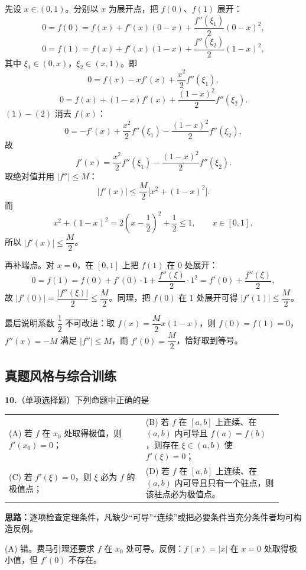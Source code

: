 先设 $x\in(0,1)$。分别以 $x$ 为展开点，把 $f(0)$、$f(1)$ 展开：
\[
0=f(0)=f(x)+f'(x)(0-x)+\frac{f''(\xi_1)}{2}(0-x)^{2},
\]
\[
0=f(1)=f(x)+f'(x)(1-x)+\frac{f''(\xi_2)}{2}(1-x)^{2},
\]
其中 $\xi_1\in(0,x)$，$\xi_2\in(x,1)$。即
\[
0=f(x)-xf'(x)+\frac{x^{2}}{2}f''(\xi_1),\tag{1}
\]
\[
0=f(x)+(1-x)f'(x)+\frac{(1-x)^{2}}{2}f''(\xi_2).\tag{2}
\]
$(1)-(2)$ 消去 $f(x)$：
\[
0=-f'(x)+\frac{x^{2}}{2}f''(\xi_1)-\frac{(1-x)^{2}}{2}f''(\xi_2),
\]
故
\[
f'(x)=\frac{x^{2}}{2}f''(\xi_1)-\frac{(1-x)^{2}}{2}f''(\xi_2).
\]
取绝对值并用 $|f''|\le M$：
\[
|f'(x)|\le\frac{M}{2}\bigl[x^{2}+(1-x)^{2}\bigr].
\]
而
\[
x^{2}+(1-x)^{2}=2\left(x-\frac12\right)^{2}+\frac12\le 1,\qquad x\in[0,1],
\]
所以 $|f'(x)|\le\dfrac{M}{2}$。

再补端点。对 $x=0$，在 $[0,1]$ 上把 $f(1)$ 在 $0$ 处展开：
\[
0=f(1)=f(0)+f'(0)\cdot 1+\frac{f''(\xi)}{2}\cdot 1^{2}
=f'(0)+\frac{f''(\xi)}{2},
\]
故 $|f'(0)|=\dfrac{|f''(\xi)|}{2}\le\dfrac{M}{2}$。同理，把 $f(0)$ 在 $1$ 处展开可得 $|f'(1)|\le\dfrac{M}{2}$。

最后说明系数 $\dfrac12$ 不可改进：取 $f(x)=\dfrac{M}{2}x(1-x)$，则 $f(0)=f(1)=0$，$f''(x)=-M$ 满足 $|f''|\le M$，而 $f'(0)=\dfrac{M}{2}$，恰好取到等号。

\else \answerarea[10] \fi%

\subsection{真题风格与综合训练}

\textbf{10.}（单项选择题）下列命题中正确的是

\begin{center}
\begin{tabular}{p{0.46\linewidth}p{0.46\linewidth}}
(A) 若 $f$ 在 $x_0$ 处取得极值，则 $f'(x_0)=0$； & (B) 若 $f$ 在 $[a,b]$ 上连续、在 $(a,b)$ 内可导且 $f(a)=f(b)$，则存在 $\xi\in(a,b)$ 使 $f'(\xi)=0$；\\[4pt]
(C) 若 $f'(\xi)=0$，则 $\xi$ 必为 $f$ 的极值点； & (D) 若 $f$ 在 $[a,b]$ 上连续、在 $(a,b)$ 内可导且只有一个驻点，则该驻点必为极值点。
\end{tabular}
\end{center}

\ifshowsolutions%
\textbf{思路：}逐项检查定理条件，凡缺少“可导”“连续”或把必要条件当充分条件者均可构造反例。

(A) 错。费马引理还要求 $f$ 在 $x_0$ 处可导。反例：$f(x)=|x|$ 在 $x=0$ 处取得极小值，但 $f'(0)$ 不存在。

